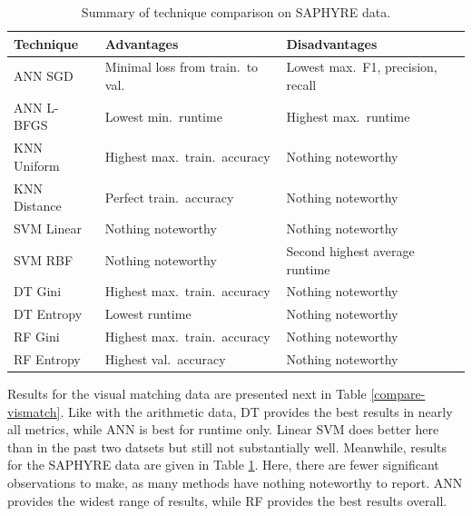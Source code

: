 \documentclass[12pt]{uthesis-v12}  %
\begin{document}
\begin{table}[!t]
\caption{Summary of technique comparison on SAPHYRE data.}
\renewcommand{\arraystretch}{1.3}
\centering
\resizebox{\textwidth}{!}
{\begin{tabular}{*{3}{l}}
\toprule
Technique & Advantages & Disadvantages \\ \midrule
ANN SGD & Minimal loss from train.~to val. & Lowest max.~F1, precision, recall \\
ANN L-BFGS & Lowest min.~runtime & Highest max.~runtime \\
KNN Uniform & Highest max.~train.~accuracy & Nothing noteworthy \\
KNN Distance & Perfect train.~accuracy & Nothing noteworthy \\
SVM Linear & Nothing noteworthy & Nothing noteworthy \\
SVM RBF & Nothing noteworthy & Second highest average runtime \\
DT Gini & Highest max.~train.~accuracy & Nothing noteworthy \\
DT Entropy & Lowest runtime & Nothing noteworthy \\
RF Gini & Highest max.~train.~accuracy & Nothing noteworthy \\
RF Entropy & Highest val.~accuracy & Nothing noteworthy \\ \bottomrule
\end{tabular}}

\label{compare-saphyre}
\end{table}

Results for the visual matching data are presented next in Table \ref{compare-vismatch}. Like with the arithmetic data, DT provides the best results in nearly all metrics, while ANN is best for runtime only. Linear SVM does better here than in the past two datsets but still not substantially well. Meanwhile, results for the SAPHYRE data are given in Table \ref{compare-saphyre}. Here, there are fewer significant observations to make, as many methods have nothing noteworthy to report. ANN provides the widest range of results, while RF provides the best results overall.
\end{document}
